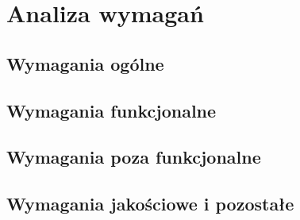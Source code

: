 \chapter{Analiza wymagań}

\section{Wymagania ogólne}
\section{Wymagania funkcjonalne}
\section{Wymagania poza funkcjonalne}
\section{Wymagania jakościowe i pozostałe}